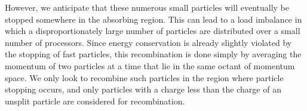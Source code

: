 \documentclass[../absorber.tex]{subfiles}
\begin{document}
However, we anticipate that these numerous small particles will eventually be stopped somewhere in the absorbing region.  This can lead to a load imbalance in which a disproportionately large number of particles are distributed over a small number of processors.  Since energy conservation is already slightly violated by the stopping of fast particles, this recombination is done simply by averaging the momentum of two particles at a time that lie in the same octant of momentum space.  We only look to recombine such particles in the region where particle stopping occurs, and only particles with a charge less than the charge of an unsplit particle are considered for recombination.
\end{document}
